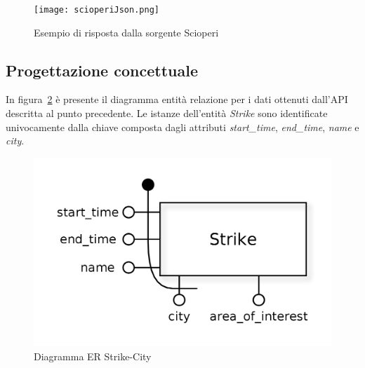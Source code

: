 \begin{figure}[H]
\centering
\texttt{[image: scioperiJson.png]}
\caption*{Esempio di risposta dalla sorgente Scioperi}
\label{fig:historicaljson}
\end{figure}

\subsection{Progettazione concettuale}

In figura~\ref{fig:strikes_er} è presente il diagramma entità relazione per i dati
ottenuti dall'API descritta al punto precedente.
Le istanze dell'entità \textit{Strike} sono identificate univocamente dalla chiave composta
dagli attributi \textit{start\_time}, \textit{end\_time}, \textit{name} e \textit{city}.

\begin{figure}                                                                                                                                                            
\centering                                                                                                                                                                   
\includegraphics[width=\textwidth/2]{diagrams/strikes_er}                                                                                                                                   
\caption{Diagramma ER Strike-City}                                                                                                                                            
\label{fig:strikes_er}                                                                                                                                                           
\end{figure}

